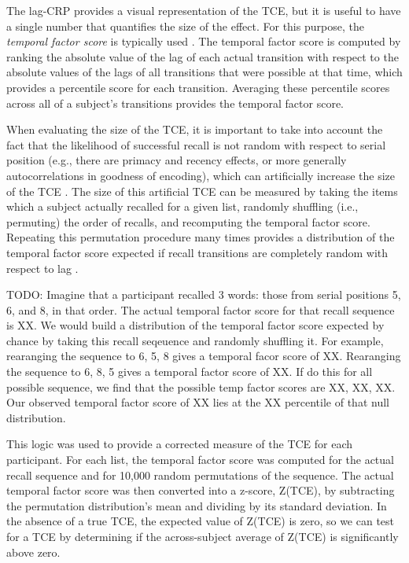 \documentclass[jou,natbib,floatsintext]{apa6} %
\begin{document}
The lag-CRP provides a visual representation of the TCE, but it is useful to have a single number that quantifies the size of the effect. For this purpose, the \emph{temporal factor score} is typically used \citep{SedeEtal10,PolyEtal09}. The temporal factor score is computed by ranking the absolute value of the lag of each actual transition with respect to the absolute values of the lags of all transitions that were possible at that time, which provides a percentile score for each transition. Averaging these percentile scores across all of a subject's transitions provides the temporal factor score.
 
When evaluating the size of the TCE, it is important to take into account the fact that the likelihood of successful recall is not random with respect to serial position (e.g., there are primacy and recency effects, or more generally autocorrelations in goodness of encoding), which can artificially increase the size of the TCE \citep{HealKaha17,Hint16}. The size of this artificial TCE can be measured by taking the items which a subject actually recalled for a given list, randomly shuffling (i.e., permuting) the order of recalls, and recomputing the temporal factor score. Repeating this permutation procedure many times provides a distribution of the temporal factor score expected if recall transitions are completely random with respect to lag \citep{HealKaha17}. 

TODO:
Imagine that a participant recalled 3 words: those from serial positions 5, 6, and 8, in that order. The actual temporal factor score for that recall sequence is XX. We would build a distribution of the temporal factor score expected by chance by taking this recall seqeuence and randomly shuffling it. For example, rearanging the sequence to 6, 5, 8 gives a temporal facor score of XX. Rearanging the sequence to 6, 8, 5 gives a temporal factor score of XX. If do this for all possible sequence, we find that the possible temp factor scores are XX, XX, XX. Our observed temporal factor score of XX lies at the XX percentile of that null distribution.


This logic was used to provide a corrected measure of the TCE for each participant. For each list, the temporal factor score was computed for the actual recall sequence and for 10,000 random permutations of the sequence. The actual temporal factor score was then converted into a z-score, Z(TCE), by subtracting the permutation distribution's mean and dividing by its standard deviation. In the absence of a true TCE, the expected value of Z(TCE) is zero, so we can test for a TCE by determining if the across-subject average of Z(TCE) is significantly above zero.   
\end{document}
